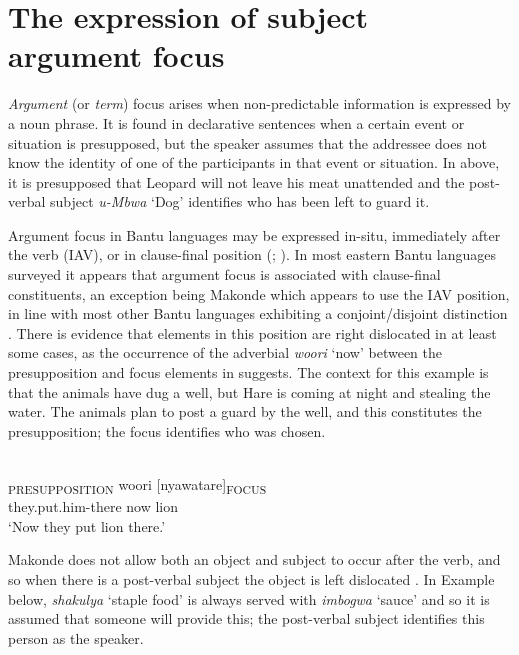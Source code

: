 \documentclass[output=paper]{langsci/langscibook}
\begin{document}
\section{The expression of subject argument focus}\label{§4:expression.nicolle}

\textit{Argument} (or \textit{term}) focus arises when non-predictable information is expressed by a noun phrase. It is found in declarative sentences when a certain event or situation is presupposed, but the speaker assumes that the addressee does not know the identity of one of the participants in that event or situation. In  above, it is presupposed that Leopard will not leave his meat unattended and the post-verbal subject \textit{u}\textit{-Mbwa} ‘Dog’ identifies who has been left to guard it.

Argument focus in Bantu languages may be expressed in-situ, immediately after the verb (IAV), or in clause-final position (\citealt[761--762]{yoneda2011}; \citealt{gibsonetaltoappear}). In most eastern Bantu languages surveyed it appears that argument focus is associated with clause-final constituents, an exception being Makonde which appears to use the IAV position, in line with most other Bantu languages exhibiting a conjoint/disjoint distinction \citep{gibsonetaltoappear}. There is evidence that elements in this position are right dislocated in at least some cases, as the occurrence of the adverbial \textit{woori} ‘now’ between the presupposition and focus elements in  suggests. The context for this example is that the animals have dug a well, but Hare is coming at night and stealing the water. The animals plan to post a guard by the well, and this constitutes the presupposition; the focus identifies who was chosen.

\ea\label{ex:16.nicolle}
\\
\gll [Mbamuta-ko]\textsubscript{PRESUPPOSITION} woori [nyawatare]\textsubscript{FOCUS}\\
{\db}they.put.him-there now {\db}lion\\
\glt ‘Now they put lion there.’
\z

Makonde does not allow both an object and subject to occur after the verb, and so when there is a post-verbal subject the object is left dislocated \citep[91]{leach2015}. In Example  below, \textit{shakulya} ‘staple food’ is always served with \textit{imbogwa} ‘sauce’ and so it is assumed that someone will provide this; the post-verbal subject identifies this person as the speaker.
\end{document}
